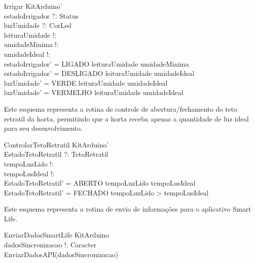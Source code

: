             \begin{schema}{Irrigar}
                \Delta KitArduino' \\
                estadoIrrigador ?: Status \\
                luzUmidade ?: CorLed \\
                leituraUmidade !: \nat \\
                umidadeMinima !: \nat \\
                umidadeIdeal !: \nat \\
            \where
                estadoIrrigador' = LIGADO \iff leituraUmidade \leq umidadeMinima \\
                estadoIrrigador' = DESLIGADO \iff leituraUmidade \geq umidadeIdeal \\
                luzUmidade' = VERDE \iff leituraUmidade \geq umidadeIdeal \\
                luzUmidade' = VERMELHO \iff leituraUmidade \leq umidadeIdeal \\
            \end{schema}


            Este esquema representa a rotina de controle de abertura/fechamento do teto retratil da horta, permitindo que a horta receba apenas a quantidade de luz ideal para seu desenvolvimento.

            \begin{schema}{ControlarTetoRetratil}
                \Delta KitArduino' \\
                EstadoTetoRetratil ?: TetoRetratil \\
                tempoLuzLido !: \nat \\
                tempoLusIdeal !: \nat \\
            \where
                EstadoTetoRetratil' = ABERTO \iff tempoLuzLido \leq tempoLusIdeal \\
                EstadoTetoRetratil' = FECHADO \iff tempoLuzLido > tempoLusIdeal \\
            \end{schema}


            Este esquema representa a rotina de envio de informações para o aplicativo Smart Life.

            \begin{schema}{EnviarDadosSmartLife}
                KitArduino \\
                dadosSincronizacao !: \seq Caracter \\
            \where
                EnviarDadosAPI(dadosSincronizacao) \\
            \end{schema}

